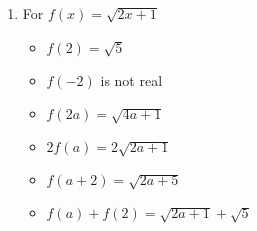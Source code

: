 \begin{enumerate}
\begin{multicols}{3}
\begin{itemize}
\end{itemize}
\end{multicols}

\begin{multicols}{3}
\begin{itemize}

\item  $2 f(a) = 6a^2+6a-4$
\item $f(a+2) = 3a^2+15a+16$
\item \small $f(a) + f(2) = 3a^2+3a+14$ \normalsize

\end{itemize}
\end{multicols}

\begin{multicols}{3}
\begin{itemize}

\item  $f \left( \frac{2}{a} \right) = \frac{12}{a^2} + \frac{6}{a} - 2$ \\
$\hphantom{f \left( \frac{2}{a} \right)} = \frac{12+6a-2a^2}{a^2}$

\vfill

\columnbreak

\item $\frac{f(a)}{2} =  \frac{3a^2+3a-2}{2}$

\vfill

\columnbreak


\item  $f(a + h) = 3a^2 + 6ah + 3h^2+3a+3h-2$

\end{itemize}
\end{multicols}

\item For $f(x) = \sqrt{2x+1}$

\begin{multicols}{3}
\begin{itemize}

\item  $f(2) = \sqrt{5}$
\item  $f(-2)$ is not real 
\item  $f(2a) = \sqrt{4a+1}$

\end{itemize}
\end{multicols}

\begin{multicols}{3}
\begin{itemize}

\item  $2 f(a) = 2\sqrt{2a+1}$
\item $f(a+2) = \sqrt{2a+5}$
\item \small $f(a) + f(2) =\sqrt{2a+1} + \sqrt{5}$ \normalsize


\end{itemize}
\end{multicols}
\end{enumerate}

